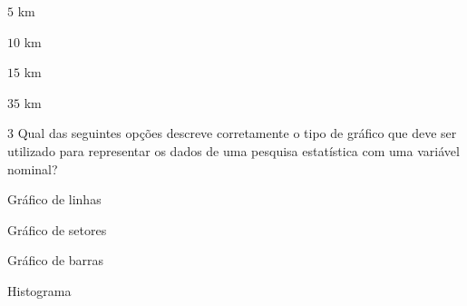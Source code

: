\begin{escolha}
\item $5$ km
\item $10$ km
\item $15$ km
\item $35$ km
\end{escolha}




\num{3}  Qual das seguintes opções descreve corretamente o tipo de gráfico que
deve ser utilizado para representar os dados de uma pesquisa estatística
com uma variável nominal?

\begin{escolha}
\item Gráfico de linhas
\item Gráfico de setores
\item Gráfico de barras
\item Histograma
\end{escolha}


